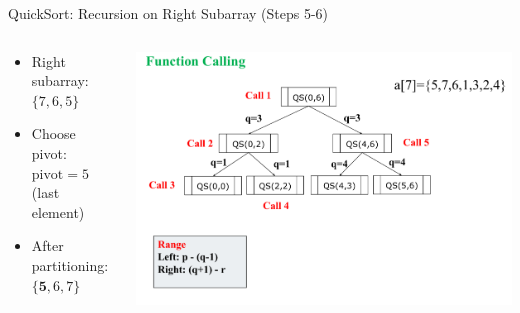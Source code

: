 \begin{frame}{QuickSort: Recursion on Right Subarray (Steps 5-6)}
  \begin{columns}
    \begin{column}{0.4\textwidth}
      \begin{itemize}
        \item Right subarray: $\{7,6,5\}$
        \item Choose pivot: $\text{pivot} = 5$ (last element)
        \item After partitioning: $\{ \textbf{5},6, 7\}$
      \end{itemize}
    \end{column}
    \begin{column}{0.6\textwidth}
      \includegraphics[width=\textwidth]{assets/Qu3.png}
    \end{column}
  \end{columns}
\end{frame}

